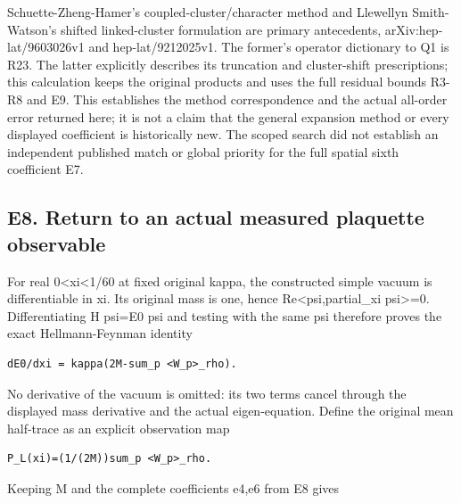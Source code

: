 \documentclass[11pt,a4paper]{article}
\renewcommand{\[}{\begingroup\small\originaldisplaystart}
\renewcommand{\]}{\originaldisplayend\endgroup}
\begin{document}
Schuette-Zheng-Hamer's coupled-cluster/character method and Llewellyn
Smith-Watson's shifted linked-cluster formulation are primary
antecedents, arXiv:hep-lat/9603026v1 and hep-lat/9212025v1. The former's
operator dictionary to Q1 is R23. The latter explicitly describes its
truncation and cluster-shift prescriptions; this calculation keeps the
original products and uses the full residual bounds R3-R8 and E9. This
establishes the method correspondence and the actual all-order error
returned here; it is not a claim that the general expansion method or
every displayed coefficient is historically new. The scoped search did
not establish an independent published match or global priority for the
full spatial sixth coefficient E7.

\subsection{E8. Return to an actual measured plaquette
observable}\label{e8.-return-to-an-actual-measured-plaquette-observable}

For real 0\textless xi\textless1/60 at fixed original kappa, the
constructed simple vacuum is differentiable in xi. Its original mass is
one, hence
{\allowbreak{} \allowbreak{}R\allowbreak{}e\allowbreak{}\textless{}\allowbreak{}p\allowbreak{}s\allowbreak{}i\allowbreak{},\allowbreak{}p\allowbreak{}a\allowbreak{}r\allowbreak{}t\allowbreak{}i\allowbreak{}a\allowbreak{}l\allowbreak{}\_\allowbreak{}x\allowbreak{}i\allowbreak{} \allowbreak{}p\allowbreak{}s\allowbreak{}i\allowbreak{}\textgreater{}\allowbreak{}=\allowbreak{}0\allowbreak{}}.
Differentiating
{\ttfamily H\allowbreak{} \allowbreak{}p\allowbreak{}s\allowbreak{}i\allowbreak{}=\allowbreak{}E\allowbreak{}0\allowbreak{} \allowbreak{}p\allowbreak{}s\allowbreak{}i\allowbreak{}}
and testing with the same psi therefore proves the exact
Hellmann-Feynman identity

\begin{verbatim}
dE0/dxi = kappa(2M-sum_p <W_p>_rho).
\end{verbatim}

No derivative of the vacuum is omitted: its two terms cancel through the
displayed mass derivative and the actual eigen-equation. Define the
original mean half-trace as an explicit observation map

\begin{verbatim}
P_L(xi)=(1/(2M))sum_p <W_p>_rho.
\end{verbatim}

Keeping M and the complete coefficients e4,e6 from E8 gives
\end{document}
